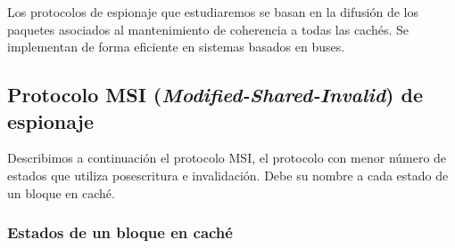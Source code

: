 Los protocolos de espionaje que estudiaremos se basan en la difusión de los paquetes asociados al mantenimiento de coherencia a todas las cachés. Se implementan de forma eficiente en sistemas basados en buses.

\subsection{Protocolo MSI (\emph{Modified-Shared-Invalid}) de espionaje}
Describimos a continuación el protocolo MSI, el protocolo con menor número de estados que utiliza posescritura e invalidación. Debe su nombre a cada estado de un bloque en caché.

\subsubsection{Estados de un bloque en caché}
